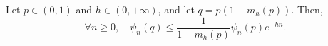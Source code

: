 \begin{theo}\label{thm:exp}
Let $p\in(0,1)$ and $h\in(0,+\infty)$, and let $q=p(1-m_h(p))$. Then,
\[
\forall n \ge 0, \quad \psi_n(q) \le \frac{1}{1-m_h(p)} \psi_n(p) e^{-hn}.
\]
\end{theo}
